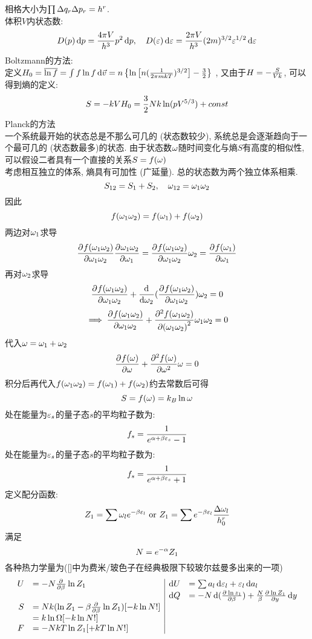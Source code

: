 \documentclass[UTF8,9pt]{ctexart}
\begin{document}
相格大小为$\prod \D q_r\D p_r=h^r$.\\
体积$V$内状态数:
$$D(p)\d p=\f{4\pi V}{h^3}p^2 \d p, \quad D(\ep)\d\ep = \f{2\pi V}{h^3}(2m)^{3/2}\ep^{1/2}\d\ep$$
Boltzmann的方法: \\
定义$H_0=\bar{\ln f}=\int f\ln f\d\vec v= n\left\{\ln\left[n(\ff{2\pi mkT})^{3/2}\right]-\f{3}{2}\right\}$ , 又由于$H=-\f{S}{Vk}$, 可以得到熵的定义:
$$S=-kVH_0=\f{3}{2}Nk\ln (pV^{5/3})+const$$
Planck的方法\\
一个系统最开始的状态总是不那么可几的 (状态数较少), 系统总是会逐渐趋向于一个最可几的 (状态数最多)的状态. 由于状态数$\o$随时间变化与熵$S$有高度的相似性, 可以假设二者具有一个直接的关系$S=f(\o)$\\
考虑相互独立的体系, 熵具有可加性 (广延量). 总的状态数为两个独立体系相乘.
$$S_{12}=S_1+S_2,\quad \o_{12}=\o_1\o_2$$
因此
$$f(\o_1\o_2)=f(\o_1)+f(\o_2)$$
两边对$\o_1$求导
$$\pp{f(\o_1\o_2)}{\o_1\o_2}\pp{\o_1\o_2}{\o_1}=\pp{f(\o_1\o_2)}{\o_1\o_2}\o_2=\pp{f(\o_1)}{\o_1}$$
再对$\o_2$求导
$$\pp{f(\o_1\o_2)}{\o_1\o_2}+\dd{}{\o_2}(\pp{f(\o_1\o_2)}{\o_1\o_2})\o_2=0$$
$$\ip \pp{f(\o_1\o_2)}{\o_1\o_2}+\pp[2]{f(\o_1\o_2)}{(\o_1\o_2)}\o_1\o_2=0$$
代入$\o=\o_1+\o_2$
$$\pp{f(\o)}{\o}+\pp[2]{f(\o)}{\o}\o=0$$
积分后再代入$f(\o_1\o_2)=f(\o_1)+f(\o_2)$约去常数后可得
$$S=f(\o)=k_B\ln \o$$
处在能量为$\ep_s$的量子态$s$的平均粒子数为:
$$f_s=\ff{e^{\a+\b\ep_s}-1}$$
处在能量为$\ep_s$的量子态$s$的平均粒子数为:
$$f_s=\ff{e^{\a+\b\ep_s}+1}$$
定义配分函数:
$$Z_1=\sum \o_le^{-\b\ep_l}\text{  or  }Z_1=\sum e^{-\b\ep_l}\f{\D \o_l}{h_0^r}$$
满足$$N=e^{-\a}Z_1$$
各种热力学量为([]中为费米/玻色子在经典极限下较玻尔兹曼多出来的一项)
$$\begin{array}{rl|rl}
		U \x -N \pp{}{\b}\ln Z_1                      & \d U \x \sum a_l\d \ep_l+\ep_l\d a_l                                                               \\
		                                              &                                      & \d Q \x -N\d(\pp{\ln z_1}{\b})+\f{N}{\b}\pp{\ln Z_1}{y}\d y \\
		S \x Nk(\ln Z_1-\b\pp{}{\b}\ln Z_1)[-k\ln N!] &                                      &                                                             \\
		\x k\ln\O[-k\ln N!]                                                                                                                                \\
		F \x -NkT\ln Z_1[+kT\ln N!]                   &                                      &
	\end{array}$$
\end{document}
